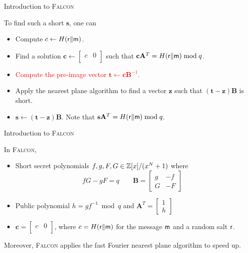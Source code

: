 \begin{frame}{Introduction to \textsc{Falcon}}

To find such a short $\mathbf{s}$, one can
\pause
\begin{itemize}
    \item Compute $c \gets H({\sf r} \| {\sf m})$.
    \pause
    \item Find a solution $\mathbf{c} \gets \left[
\begin{array}{c|c} c & 0 \\ \end{array} \right]$ such that $\mathbf{c}\mathbf{A}^T = H({\sf r} \| {\sf m}) \bmod q$.
    \pause
    \item \textcolor<7->{red}{Compute the pre-image vector $\mathbf{t} \gets \mathbf{c}\mathbf{B}^{-1}$.}
    \pause
    \item Apply the nearest plane algorithm \cite{ducas2016fast} to find a vector $\mathbf{z}$ such that $\mathbf{(t-z)B}$ is short.
    \pause
    \item $\mathbf{s} \gets \mathbf{(t-z)B}$. Note that $\mathbf{s}\mathbf{A}^T = H({\sf r} \| {\sf m}) \bmod q$.
\end{itemize}

\end{frame}



%



%
%
%
\iffalse

\begin{frame}{Introduction to \textsc{Falcon}}

In \textsc{Falcon},
\pause
\begin{itemize}
    \item Short secret polynomials $f, g, F, G \in \mathbb{Z}[x] / (x^N+1)$ where
    \[
    fG - gF = q \qquad \mathbf{B} = \left[
\begin{array}{c|c}
g & -f \\ \hline G & -F
\end{array} \right]
    \]
    \pause
    \item Public polynomial $h = gf^{-1} \bmod q$ and $\mathbf{A}^T = \left[
\begin{array}{c} 1 \\ \hline h \end{array} \right]$ 
	\pause
	\item $\mathbf{c} = \left[
\begin{array}{c|c} c & 0 \\ \end{array} \right]$, where $c = H({\sf r} \| {\sf m})$ for the message $\sf m$ and a random salt $\sf r$.
\end{itemize}

\pause
Moreover, \textsc{Falcon} applies the fast Fourier nearest plane algorithm \cite{ducas2016fast} to speed up.

\end{frame}


